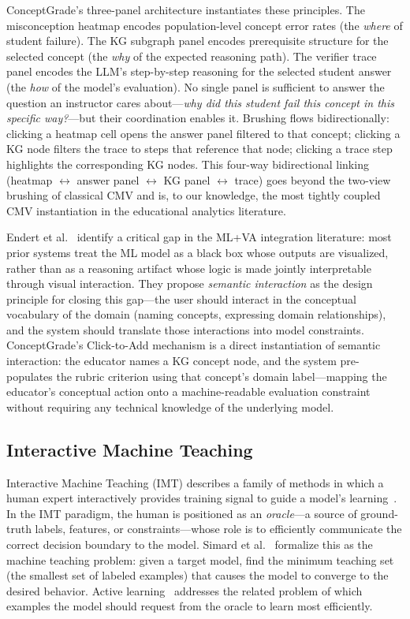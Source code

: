 \documentclass[journal,review]{vgtc}
\begin{document}
ConceptGrade's three-panel architecture instantiates these principles. The misconception heatmap encodes population-level concept error rates (the \textit{where} of student failure). The KG subgraph panel encodes prerequisite structure for the selected concept (the \textit{why} of the expected reasoning path). The verifier trace panel encodes the LLM's step-by-step reasoning for the selected student answer (the \textit{how} of the model's evaluation). No single panel is sufficient to answer the question an instructor cares about---\textit{why did this student fail this concept in this specific way?}---but their coordination enables it. Brushing flows bidirectionally: clicking a heatmap cell opens the answer panel filtered to that concept; clicking a KG node filters the trace to steps that reference that node; clicking a trace step highlights the corresponding KG nodes. This four-way bidirectional linking (heatmap $\leftrightarrow$ answer panel $\leftrightarrow$ KG panel $\leftrightarrow$ trace) goes beyond the two-view brushing of classical CMV and is, to our knowledge, the most tightly coupled CMV instantiation in the educational analytics literature.

Endert et al.~\cite{Endert2017} identify a critical gap in the ML+VA integration literature: most prior systems treat the ML model as a black box whose outputs are visualized, rather than as a reasoning artifact whose logic is made jointly interpretable through visual interaction. They propose \textit{semantic interaction} as the design principle for closing this gap---the user should interact in the conceptual vocabulary of the domain (naming concepts, expressing domain relationships), and the system should translate those interactions into model constraints. ConceptGrade's Click-to-Add mechanism is a direct instantiation of semantic interaction: the educator names a KG concept node, and the system pre-populates the rubric criterion using that concept's domain label---mapping the educator's conceptual action onto a machine-readable evaluation constraint without requiring any technical knowledge of the underlying model.

\subsection{Interactive Machine Teaching}

Interactive Machine Teaching (IMT) describes a family of methods in which a human expert interactively provides training signal to guide a model's learning~\cite{Amershi2014}. In the IMT paradigm, the human is positioned as an \textit{oracle}---a source of ground-truth labels, features, or constraints---whose role is to efficiently communicate the correct decision boundary to the model. Simard et al.~\cite{Simard2017} formalize this as the machine teaching problem: given a target model, find the minimum teaching set (the smallest set of labeled examples) that causes the model to converge to the desired behavior. Active learning~\cite{Settles2009} addresses the related problem of which examples the model should request from the oracle to learn most efficiently.
\end{document}
